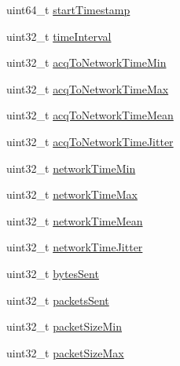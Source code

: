 \begin{DoxyCompactItemize}
\item 
uint64\+\_\+t \hyperlink{struct_a_r_s_t_r_e_a_m2___stream_sender___monitoring_data__t_ad7ac50b9d1b167576422cf4a33809dec}{start\+Timestamp}
\item 
uint32\+\_\+t \hyperlink{struct_a_r_s_t_r_e_a_m2___stream_sender___monitoring_data__t_ad90c1eec185664fad0ec256cb8fc2d04}{time\+Interval}
\item 
uint32\+\_\+t \hyperlink{struct_a_r_s_t_r_e_a_m2___stream_sender___monitoring_data__t_a83be236e99138b051413d6c90a56777f}{acq\+To\+Network\+Time\+Min}
\item 
uint32\+\_\+t \hyperlink{struct_a_r_s_t_r_e_a_m2___stream_sender___monitoring_data__t_a4ba62badc698bb064b79a0a701a1d46e}{acq\+To\+Network\+Time\+Max}
\item 
uint32\+\_\+t \hyperlink{struct_a_r_s_t_r_e_a_m2___stream_sender___monitoring_data__t_a9fafdd46cad5b6ccd864b8a98a4ad0e1}{acq\+To\+Network\+Time\+Mean}
\item 
uint32\+\_\+t \hyperlink{struct_a_r_s_t_r_e_a_m2___stream_sender___monitoring_data__t_a0f162472ca1c2d5563888c3ed5c7ffc2}{acq\+To\+Network\+Time\+Jitter}
\item 
uint32\+\_\+t \hyperlink{struct_a_r_s_t_r_e_a_m2___stream_sender___monitoring_data__t_a6d727231a1f179c881489f6acbc16909}{network\+Time\+Min}
\item 
uint32\+\_\+t \hyperlink{struct_a_r_s_t_r_e_a_m2___stream_sender___monitoring_data__t_a5a8c97363c553fdd62cb517324dc3e2d}{network\+Time\+Max}
\item 
uint32\+\_\+t \hyperlink{struct_a_r_s_t_r_e_a_m2___stream_sender___monitoring_data__t_a77bd40b1792b391513394d1477e46ea1}{network\+Time\+Mean}
\item 
uint32\+\_\+t \hyperlink{struct_a_r_s_t_r_e_a_m2___stream_sender___monitoring_data__t_a63b220f58d4b5f711520c8353eb893c4}{network\+Time\+Jitter}
\item 
uint32\+\_\+t \hyperlink{struct_a_r_s_t_r_e_a_m2___stream_sender___monitoring_data__t_a1f6cfac29e1bffd515f4f32b3dd2de57}{bytes\+Sent}
\item 
uint32\+\_\+t \hyperlink{struct_a_r_s_t_r_e_a_m2___stream_sender___monitoring_data__t_a495cf5153cbd597676f93c18ecc7d92c}{packets\+Sent}
\item 
uint32\+\_\+t \hyperlink{struct_a_r_s_t_r_e_a_m2___stream_sender___monitoring_data__t_a0d6261dd1df3670d06f19e2568d90c68}{packet\+Size\+Min}
\item 
uint32\+\_\+t \hyperlink{struct_a_r_s_t_r_e_a_m2___stream_sender___monitoring_data__t_a755bcb54662c4734742938aa31fc808f}{packet\+Size\+Max}

\end{DoxyCompactItemize}

